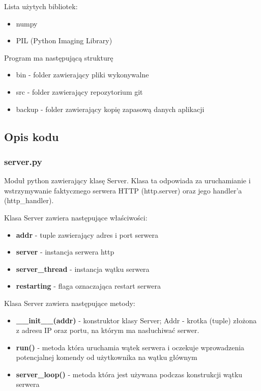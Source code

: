 \documentclass{article}
\begin{document}
Lista użytych bibliotek:
\begin{itemize}
    \item numpy
    \item PIL (Python Imaging Library)
\end{itemize}



Program ma następującą strukturę
\begin{itemize}
    \item bin - folder zawierający pliki wykonywalne
    \item src - folder zawierający repozytorium git
    \item backup - folder zawierający kopię zapasową danych aplikacji
\end{itemize}

\subsection{Opis kodu}
\subsubsection{server.py}
Moduł python zawierający klasę Server. Klasa ta odpowiada za uruchamianie i wstrzymywanie faktycznego serwera HTTP (http.server) oraz jego handler'a (http\_handler).

Klasa Server zawiera następujące właściwości:
\begin{itemize}
    \item \textbf{addr} - tuple zawierający adres i port serwera
    \item \textbf{server} - instancja serwera http
    \item \textbf{server\_thread} - instancja wątku serwera
    \item \textbf{restarting} - flaga oznaczająca restart serwera
\end{itemize}

Klasa Server zawiera następujące metody:
\begin{itemize}
    \item \textbf{\_\_init\_\_(addr)} - konstruktor klasy Server; Addr - krotka (tuple) złożona z adresu IP oraz portu, na którym ma nasłuchiwać serwer.
    \item \textbf{run()} - metoda która uruchamia wątek serwera i oczekuje wprowadzenia potencjalnej komendy od użytkownika na wątku głównym
    \item \textbf{server\_loop()} - metoda która jest używana podczas konstrukcji wątku serwera 
\end{itemize}
\end{document}
